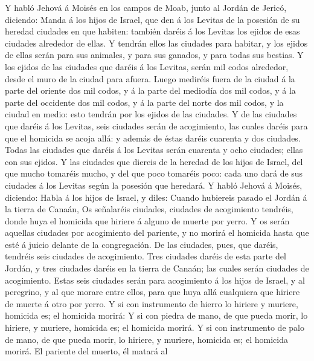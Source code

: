  Y habló Jehová á Moisés en los campos de Moab, junto al
Jordán de Jericó, diciendo:  Manda á los hijos de Israel,
que den á los Levitas de la posesión de su heredad ciudades en que
habiten: también daréis á los Levitas los ejidos de esas ciudades
alrededor de ellas.  Y tendrán ellos las ciudades para
habitar, y los ejidos de ellas serán para sus animales, y para sus
ganados, y para todas sus bestias.  Y los ejidos de las
ciudades que daréis á los Levitas, serán mil codos alrededor, desde el
muro de la ciudad para afuera.  Luego mediréis fuera de la
ciudad á la parte del oriente dos mil codos, y á la parte del mediodía
dos mil codos, y á la parte del occidente dos mil codos, y á la parte
del norte dos mil codos, y la ciudad en medio: esto tendrán por los
ejidos de las ciudades.  Y de las ciudades que daréis á los
Levitas, seis ciudades serán de acogimiento, las cuales daréis para que
el homicida se acoja allá: y además de éstas daréis cuarenta y dos
ciudades.  Todas las ciudades que daréis á los Levitas serán
cuarenta y ocho ciudades; ellas con sus ejidos.  Y las
ciudades que diereis de la heredad de los hijos de Israel, del que mucho
tomaréis mucho, y del que poco tomaréis poco: cada uno dará de sus
ciudades á los Levitas según la posesión que heredará.  Y
habló Jehová á Moisés, diciendo:  Habla á los hijos de
Israel, y diles: Cuando hubiereis pasado el Jordán á la tierra de
Canaán,  Os señalaréis ciudades, ciudades de acogimiento
tendréis, donde huya el homicida que hiriere á alguno de muerte por
yerro.  Y os serán aquellas ciudades por acogimiento del
pariente, y no morirá el homicida hasta que esté á juicio delante de la
congregación.  De las ciudades, pues, que daréis, tendréis
seis ciudades de acogimiento.  Tres ciudades daréis de esta
parte del Jordán, y tres ciudades daréis en la tierra de Canaán; las
cuales serán ciudades de acogimiento.  Estas seis ciudades
serán para acogimiento á los hijos de Israel, y al peregrino, y al que
morare entre ellos, para que huya allá cualquiera que hiriere de muerte
á otro por yerro.  Y si con instrumento de hierro lo
hiriere y muriere, homicida es; el homicida morirá:  Y si
con piedra de mano, de que pueda morir, lo hiriere, y muriere, homicida
es; el homicida morirá.  Y si con instrumento de palo de
mano, de que pueda morir, lo hiriere, y muriere, homicida es; el
homicida morirá.  El pariente del muerto, él matará al
